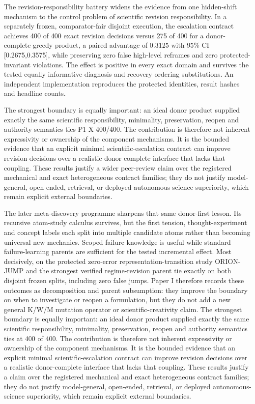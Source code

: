 The revision-responsibility battery widens the evidence from one hidden-shift
mechanism to the control problem of scientific revision responsibility. In a
separately frozen, comparator-fair disjoint execution, the escalation contract
achieves 400 of 400 exact revision decisions versus 275 of 400 for a
donor-complete greedy product, a paired advantage of 0.3125 with 95\% CI
[0.2675,0.3575], while preserving zero false high-level reframes and zero
protected-invariant violations. The effect is positive in every exact domain and
survives the tested equally informative diagnosis and recovery ordering
substitutions. An independent implementation reproduces the protected
identities, result hashes and headline counts.

The strongest boundary is equally important: an ideal donor product supplied exactly the same scientific responsibility, minimality, preservation, reopen and authority semantics ties P1-X 400/400. The contribution is therefore not inherent expressivity or ownership of the component mechanisms. It is the bounded evidence that an explicit minimal scientific-escalation contract can improve revision decisions over a realistic donor-complete interface that lacks that coupling. These results justify a wider peer-review claim over the registered mechanical and exact heterogeneous contract families; they do not justify model-general, open-ended, retrieval, or deployed autonomous-science superiority, which remain explicit external boundaries.

The later meta-discovery programme sharpens that same donor-first lesson. Its recursive atom-study calculus survives, but the first tension, thought-experiment and concept labels each split into multiple candidate atoms rather than becoming universal new mechanics. Scoped failure knowledge is useful while standard failure-learning parents are sufficient for the tested incremental effect. Most decisively, on the protected zero-error representation-transition study ORION-JUMP and the strongest verified regime-revision parent tie exactly on both disjoint frozen splits, including zero false jumps. Paper I therefore records these outcomes as decomposition and parent subsumption: they improve the boundary on when to investigate or reopen a formulation, but they do not add a new general K/W/M mutation operator or scientific-creativity claim.
The strongest boundary is equally important: an ideal donor product supplied
exactly the same scientific responsibility, minimality, preservation, reopen and
authority semantics ties at 400 of 400. The contribution is therefore not
inherent expressivity or ownership of the component mechanisms. It is the
bounded evidence that an explicit minimal scientific-escalation contract can
improve revision decisions over a realistic donor-complete interface that lacks
that coupling. These results justify a claim over the registered mechanical and
exact heterogeneous contract families; they do not justify model-general,
open-ended, retrieval, or deployed autonomous-science superiority, which remain
explicit external boundaries.

